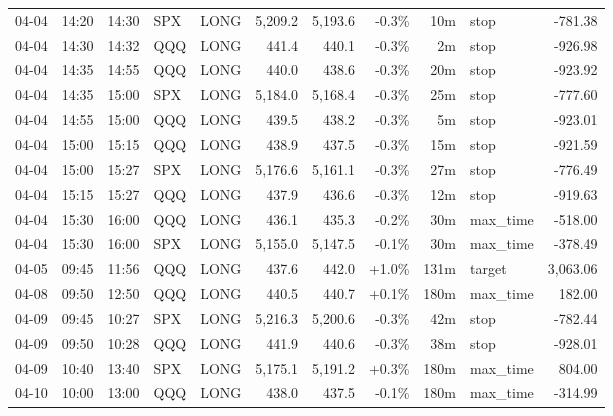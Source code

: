 \documentclass[11pt,a4paper,twoside]{article}
\begin{document}
\begin{center}
\begin{longtable}{>{\color{txtmain}}l l l l l r r r r >{\color{txtmain}}l r}
04-04 & 14:20 & 14:30 & SPX & LONG & 5,209.2 & 5,193.6 & \textcolor{lossred}{-0.3\%} & 10m & stop & \textcolor{lossred}{-781.38} \\
04-04 & 14:30 & 14:32 & QQQ & LONG & 441.4 & 440.1 & \textcolor{lossred}{-0.3\%} & 2m & stop & \textcolor{lossred}{-926.98} \\
04-04 & 14:35 & 14:55 & QQQ & LONG & 440.0 & 438.6 & \textcolor{lossred}{-0.3\%} & 20m & stop & \textcolor{lossred}{-923.92} \\
04-04 & 14:35 & 15:00 & SPX & LONG & 5,184.0 & 5,168.4 & \textcolor{lossred}{-0.3\%} & 25m & stop & \textcolor{lossred}{-777.60} \\
04-04 & 14:55 & 15:00 & QQQ & LONG & 439.5 & 438.2 & \textcolor{lossred}{-0.3\%} & 5m & stop & \textcolor{lossred}{-923.01} \\
04-04 & 15:00 & 15:15 & QQQ & LONG & 438.9 & 437.5 & \textcolor{lossred}{-0.3\%} & 15m & stop & \textcolor{lossred}{-921.59} \\
04-04 & 15:00 & 15:27 & SPX & LONG & 5,176.6 & 5,161.1 & \textcolor{lossred}{-0.3\%} & 27m & stop & \textcolor{lossred}{-776.49} \\
04-04 & 15:15 & 15:27 & QQQ & LONG & 437.9 & 436.6 & \textcolor{lossred}{-0.3\%} & 12m & stop & \textcolor{lossred}{-919.63} \\
04-04 & 15:30 & 16:00 & QQQ & LONG & 436.1 & 435.3 & \textcolor{lossred}{-0.2\%} & 30m & max\_time & \textcolor{lossred}{-518.00} \\
04-04 & 15:30 & 16:00 & SPX & LONG & 5,155.0 & 5,147.5 & \textcolor{lossred}{-0.1\%} & 30m & max\_time & \textcolor{lossred}{-378.49} \\
04-05 & 09:45 & 11:56 & QQQ & LONG & 437.6 & 442.0 & \textcolor{wingreen}{+1.0\%} & 131m & target & \textcolor{wingreen}{3,063.06} \\
04-08 & 09:50 & 12:50 & QQQ & LONG & 440.5 & 440.7 & \textcolor{wingreen}{+0.1\%} & 180m & max\_time & \textcolor{wingreen}{182.00} \\
04-09 & 09:45 & 10:27 & SPX & LONG & 5,216.3 & 5,200.6 & \textcolor{lossred}{-0.3\%} & 42m & stop & \textcolor{lossred}{-782.44} \\
04-09 & 09:50 & 10:28 & QQQ & LONG & 441.9 & 440.6 & \textcolor{lossred}{-0.3\%} & 38m & stop & \textcolor{lossred}{-928.01} \\
04-09 & 10:40 & 13:40 & SPX & LONG & 5,175.1 & 5,191.2 & \textcolor{wingreen}{+0.3\%} & 180m & max\_time & \textcolor{wingreen}{804.00} \\
04-10 & 10:00 & 13:00 & QQQ & LONG & 438.0 & 437.5 & \textcolor{lossred}{-0.1\%} & 180m & max\_time & \textcolor{lossred}{-314.99} \\

\end{longtable}
\end{center}
\end{document}
